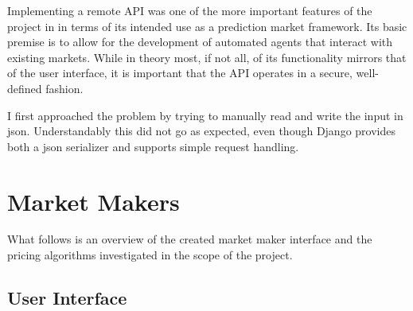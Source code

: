 \documentclass[bsc,frontabs,twoside,singlespacing,parskip,deptreport]{infthesis}     %
\begin{document}
    Implementing a remote API was one of the more important features of the project in in terms of its intended use as a prediction market framework. Its basic premise is to allow for the development of automated agents that interact with existing markets. While in theory most, if not all, of its functionality mirrors that of the user interface, it is important that the API operates in a secure, well-defined fashion.
    
    I first approached the problem by trying to manually read and write the input in json. Understandably this did not go as expected, even though Django provides both a json serializer and supports simple request handling. 
    
\section{Market Makers}
    What follows is an overview of the created market maker interface and the pricing algorithms investigated in the scope of the project.

\subsection{User Interface}
\end{document}
